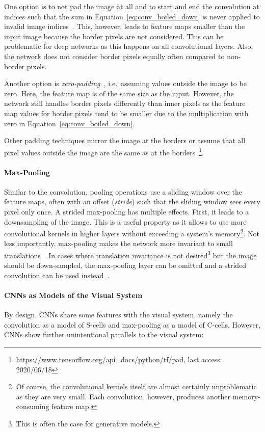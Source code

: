 One option is to not pad the image at all and to start and end the convolution at indices such that the sum in Equation~\ref{eq:conv_boiled_down} is never applied to invalid image indices~\citep[p. 350]{Goodfellow-et-al-2016}.
This, however, leads to feature maps smaller than the input image because the border pixels are not considered.
This can be problematic for deep networks as this happens on all convolutional layers.
Also, the network does not consider border pixels equally often compared to non-border pixels.

Another option is \textit{zero-padding}~\citep[p. 350]{Goodfellow-et-al-2016}, i.e.~assuming values outside the image to be zero.
Here, the feature map is of the same size as the input.
However, the network still handles border pixels differently than inner pixels as the feature map values for border pixels tend to be smaller due to the multiplication with zero in Equation~\ref{eq:conv_boiled_down}.

Other padding techniques mirror the image at the borders or assume that all pixel values outside the image are the same as at the borders~\footnote{\href{https://www.tensorflow.org/api\_docs/python/tf/pad}{https://www.tensorflow.org/api\_docs/python/tf/pad}, last access: 2020/06/18}.

\paragraph{Max-Pooling}
Similar to the convolution, pooling operations use a sliding window over the feature maps, often with an offset (\textit{stride}) such that the sliding window sees every pixel only once.
A strided max-pooling has multiple effects.
First, it leads to a downsampling of the image.
This is a useful property as it allows to use more convolutional kernels in higher layers without exceeding a system's memory\footnote{Of course, the convolutional kernels itself are almost certainly unproblematic as they are very small. Each convolution, however, produces another memory-consuming feature map.}.
Not less importantly, max-pooling makes the network more invariant to small translations~\citep[p. 342]{Goodfellow-et-al-2016}.
In cases where translation invariance is not desired\footnote{This is often the case for generative models.} but the image should be down-sampled, the max-pooling layer can be omitted and a strided convolution can be used instead~\citep[p. 337]{Goodfellow-et-al-2016}.

\paragraph{\acfp{CNN} as Models of the Visual System}
By design, \acp{CNN} share some features with the visual system, namely the convolution as a model of S-cells and max-pooling as a model of C-cells.
However, \acp{CNN} show further unintentional parallels to the visual system:

